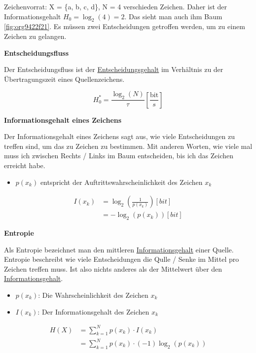 \documentclass[11pt,twoside,twocolumn,landscape]{article}
\begin{document}
Zeichenvorrat: X = \{a, b, c, d\}, N = 4 verschieden Zeichen.
Daher ist der Informationsgehalt \(H_0 = \log_2(4) = 2\).
Das sieht man auch ihm Baum \ref{fig:org9422f21}.
Es müssen zwei Entscheidungen getroffen werden, um zu einem Zeichen zu gelangen.

\textbf{Entscheidungsfluss}

Der Entscheidungsfluss ist der \href{../../../roam/20211001174136-was_ist_der_entscheidungsgehalt.org}{Entscheidungsgehalt} im Verhältnis zu der Übertragungszeit eines Quellenzeichens.

\begin{equation}
H_0^* = \frac{\log_2(N)}{\tau}[\frac{\text{bit}}{s}]
\end{equation}

\textbf{Informationsgehalt eines Zeichens}

Der Informationsgehalt eines Zeichens sagt aus, wie viele Entscheidungen zu treffen sind, um das zu Zeichen zu bestimmen.
Mit anderen Worten, wie viele mal muss ich zwischen Rechts / Links im Baum entscheiden, bis ich das Zeichen erreicht habe.

\begin{itemize}
\item \(p(x_k)\) entspricht der Auftrittswahrscheinlichkeit des Zeichen \(x_k\)
\end{itemize}

\begin{align}
I(x_k) &= \log_2(\frac{1}{p(x_k)}) [bit] \\
&= -\log_2(p(x_k)) [bit]
\end{align}

\textbf{Entropie}

Als Entropie bezeichnet man den mittleren \href{../../../roam/20211001175826-was_ist_der_informationsgehalt_eines_zeichen.org}{Informationsgehalt} einer Quelle.
Entropie beschreibt wie viele Entscheidungen die Qulle / Senke im Mittel pro Zeichen treffen muss.
Ist also nichts anderes als der Mittelwert über den \href{../../../roam/20211001175826-was_ist_der_informationsgehalt_eines_zeichen.org}{Informationsgehalt}.

\begin{itemize}
\item \(p(x_k)\): Die Wahrscheinlichkeit des Zeichen \(x_k\)
\item \(I(x_k)\): Der Informationsgehalt des Zeichen \(x_k\)
\end{itemize}

\begin{align}
H(X) &= \sum_{k=1}^N p(x_k) \cdot I(x_k) \\
&= \sum_{k=1}^N p(x_k) \cdot (-1)\log_2(p(x_k))
\end{align}
\end{document}
